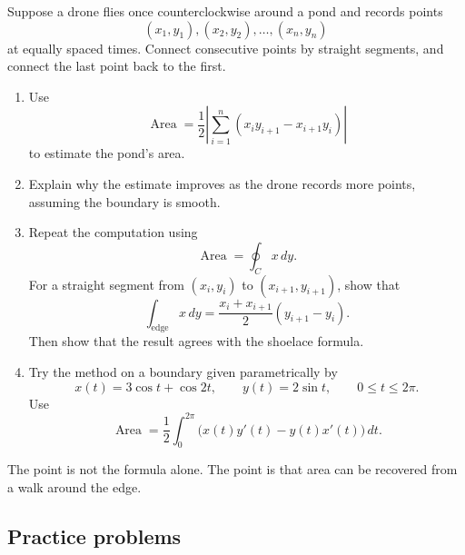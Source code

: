 Suppose a drone flies once counterclockwise around a pond and records points
\[
    (x_1,y_1),(x_2,y_2),\ldots,(x_n,y_n)
\]
at equally spaced times.  Connect consecutive points by straight segments, and connect
the last point back to the first.

\begin{enumerate}
\item Use
\[
    \operatorname{Area}
    =
    \frac12
    \left|
    \sum_{i=1}^n
    (x_i y_{i+1}-x_{i+1}y_i)
    \right|
\]
to estimate the pond's area.

\item Explain why the estimate improves as the drone records more points, assuming the
boundary is smooth.

\item Repeat the computation using
\[
    \operatorname{Area}=\oint_C x\,dy.
\]
For a straight segment from \((x_i,y_i)\) to \((x_{i+1},y_{i+1})\), show that
\[
    \int_{\text{edge}}x\,dy
    =
    \frac{x_i+x_{i+1}}{2}(y_{i+1}-y_i).
\]
Then show that the result agrees with the shoelace formula.

\item Try the method on a boundary given parametrically by
\[
    x(t)=3\cos t+\cos 2t,
    \qquad
    y(t)=2\sin t,
    \qquad
    0\le t\le2\pi.
\]
Use
\[
    \operatorname{Area}
    =
    \frac12\int_0^{2\pi}
    \bigl(x(t)y'(t)-y(t)x'(t)\bigr)\,dt.
\]
\end{enumerate}

The point is not the formula alone.  The point is that area can be recovered from a
walk around the edge.

\subsection{Practice problems}

